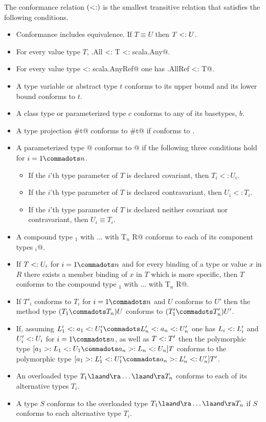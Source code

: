 \documentclass[11pt]{report}
\begin{document}
The conformance relation $(<:)$ is the smallest 
transitive relation that satisfies the following conditions.
\begin{itemize}
\item Conformance includes equivalence. If $T \equiv U$ then $T <: U$.
\item For every value type $T$, \verb@scala.All <: T <: scala.Any@. 
\item For every value type \verb@T <: scala.AnyRef@ one has \verb@scala.AllRef <: T@.
\item A type variable or abstract type $t$ conforms to its upper bound and
      its lower bound conforms to $t$. 
\item A class type or parameterized type $c$ conforms to any of its basetypes, $b$.
\item A type projection \verb@T#t@ conforms to \verb@U#t@ if 
      \verb@T@ conforms to \verb@U@.
\item A parameterized type \verb@T[T$_1$, ..., T$_n$]@ conforms to 
      \verb@T[U$_1$, ..., U$_n$]@ if
      the following three conditions hold for $i = 1 \commadots n$. 
      \begin{itemize}
      \item
      If the $i$'th type parameter of $T$ is declared covariant, then $T_i <: U_i$.
      \item
      If the $i$'th type parameter of $T$ is declared contravariant, then $U_i <: T_i$.
      \item
      If the $i$'th type parameter of $T$ is declared neither covariant 
      nor contravariant, then $U_i \equiv T_i$.
      \end{itemize}
\item A compound type \verb@T$_1$ with ... with T$_n$ {R}@ conforms to
      each of its component types \verb@T$_i$@.
\item If $T <: U_i$ for $i = 1 \commadots n$ and for every
      binding of a type or value $x$ in $R$ there exists a member binding of
      $x$ in $T$ which is more specific, then $T$ conforms to
      the compound type \verb@T$_1$ with ... with T$_n$ {R}@.  
\item If
	$T'_i$ conforms to $T_i$ for $i = 1 \commadots n$ and $U$ conforms to $U'$ 
        then the method type $(T_1 \commadots T_n) U$ conforms to
	$(T'_1 \commadots T'_n) U'$.
\item If, assuming 
$L'_1 \conforms a_1 \conforms U'_1 \commadots L'_n \conforms a_n \conforms U'_n$ 
one has $L_i <: L'_i$ and $U'_i <: U_i$
for $i = 1 \commadots n$, as well as $T <: T'$ then the polymorphic type
$[a_1 >: L_1 <: U_1 \commadots a_n >: L_n <: U_n] T$ conforms to the polymorphic type
$[a_1 >: L'_1 <: U'_1 \commadots a_n >: L'_n <: U'_n] T'$.
\item 
An overloaded type $T_1 \overload \ldots \overload T_n$ conforms to each of its alternative types $T_i$.
\item
A type $S$ conforms to the overloaded type $T_1 \overload \ldots \overload T_n$
if $S$ conforms to each alternative type $T_i$.
\end{itemize}
\end{document}
